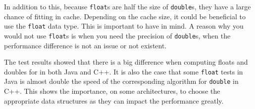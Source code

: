In addition to this, because \texttt{float}s are half the size of \texttt{double}s, they have a large chance of fitting in cache. Depending on the cache size, it could be beneficial to use the \texttt{float} data type. This is important to have in mind. A reason why you would not use \texttt{float}s is when you need the precision of \texttt{double}s, when the performance difference is not an issue or not existent.

The test results showed that there is a big difference when computing floats and doubles for in both Java and C++. It is also the case that some \texttt{float} tests in Java is almost double the speed of the corresponding algorithm for \texttt{double} in C++. This shows the importance, on some architectures, to choose the appropriate data structures as they can impact the performance greatly.
